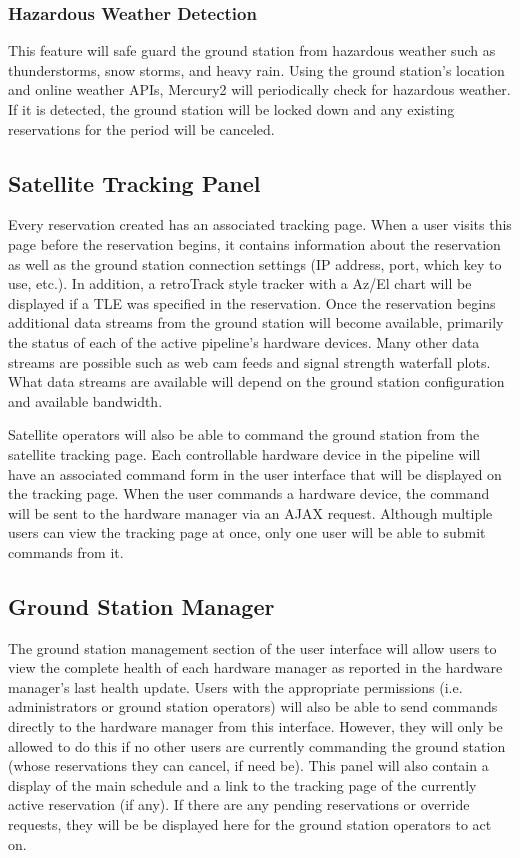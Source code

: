 \documentclass{mxl-design}
\begin{document}
\subsubsection{Hazardous Weather Detection}
This feature will safe guard the ground station from hazardous weather such as thunderstorms, snow storms, and heavy rain. Using the ground station's location and online weather APIs, Mercury2 will periodically check for hazardous weather. If it is detected, the ground station will be locked down and any existing reservations for the period will be canceled. 

\subsection{Satellite Tracking Panel}
Every reservation created has an associated tracking page. When a user visits this page before the reservation begins, it contains information about the reservation as well as the ground station connection settings (IP address, port, which key to use, etc.). In addition, a retroTrack style tracker with a Az/El chart will be displayed if a TLE was specified in the reservation. Once the reservation begins additional data streams from the ground station will become available, primarily the status of each of the active pipeline's hardware devices. Many other data streams are possible such as web cam feeds and signal strength waterfall plots. What data streams are available will depend on the ground station configuration and available bandwidth.

Satellite operators will also be able to command the ground station from the satellite tracking page. Each controllable hardware device in the pipeline will have an associated command form in the user interface that will be displayed on the tracking page. When the user commands a hardware device, the command will be sent to the hardware manager via an AJAX request. Although multiple users can view the tracking page at once, only one user will be able to submit commands from it.

\subsection{Ground Station Manager}
The ground station management section of the user interface will allow users to view the complete health of each hardware manager as reported in the hardware manager's last health update. Users with the appropriate permissions (i.e. administrators or ground station operators) will also be able to send commands directly to the hardware manager from this interface. However, they will only be allowed to do this if no other users are currently commanding the ground station (whose reservations they can cancel, if need be). This panel will also contain a display of the main schedule and a link to the tracking page of the currently active reservation (if any). If there are any pending reservations or override requests, they will be be displayed here for the ground station operators to act on.
\end{document}
